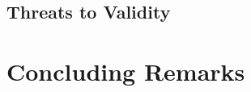\documentclass{sig-alternate}
\begin{document}
\linespread{0.87}
\subsection{Threats to Validity}\label{threats}
		
		
%	
\linespread{0.87}
\section{Concluding Remarks}\label{conclusion}
		

%	      
	
\small
		

\end{document}
